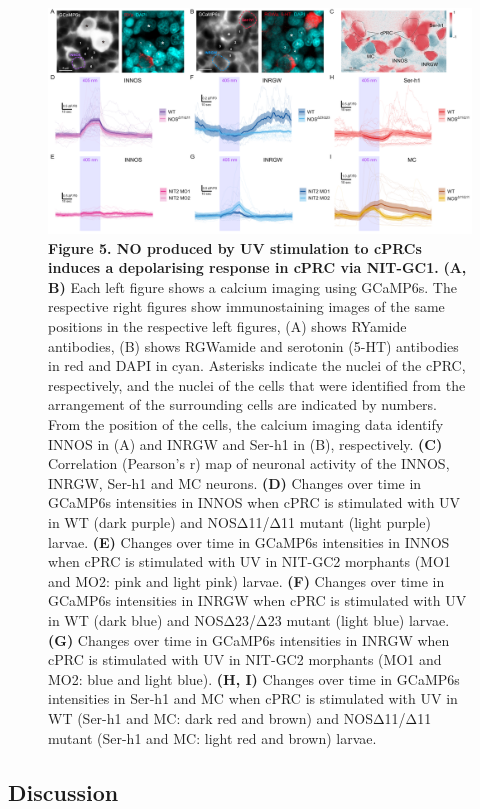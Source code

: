 \documentclass[
  10pt,
  onecolumn]{article}
\begin{document}
\begin{figure}
\centering
\includegraphics[width=1\textwidth,height=\textheight]{../figures/Fig5.png}
\caption{\textbf{Figure 5. NO produced by UV stimulation to cPRCs
induces a depolarising response in cPRC via NIT-GC1.} \textbf{(A, B)}
Each left figure shows a calcium imaging using GCaMP6s. The respective
right figures show immunostaining images of the same positions in the
respective left figures, (A) shows RYamide antibodies, (B) shows
RGWamide and serotonin (5-HT) antibodies in red and DAPI in cyan.
Asterisks indicate the nuclei of the cPRC, respectively, and the nuclei
of the cells that were identified from the arrangement of the
surrounding cells are indicated by numbers. From the position of the
cells, the calcium imaging data identify INNOS in (A) and INRGW and
Ser-h1 in (B), respectively. \textbf{(C)} Correlation (Pearson's r) map
of neuronal activity of the INNOS, INRGW, Ser-h1 and MC neurons.
\textbf{(D)} Changes over time in GCaMP6s intensities in INNOS when cPRC
is stimulated with UV in WT (dark purple) and NOSΔ11/Δ11 mutant (light
purple) larvae. \textbf{(E)} Changes over time in GCaMP6s intensities in
INNOS when cPRC is stimulated with UV in NIT-GC2 morphants (MO1 and MO2:
pink and light pink) larvae. \textbf{(F)} Changes over time in GCaMP6s
intensities in INRGW when cPRC is stimulated with UV in WT (dark blue)
and NOSΔ23/Δ23 mutant (light blue) larvae. \textbf{(G)} Changes over
time in GCaMP6s intensities in INRGW when cPRC is stimulated with UV in
NIT-GC2 morphants (MO1 and MO2: blue and light blue). \textbf{(H, I)}
Changes over time in GCaMP6s intensities in Ser-h1 and MC when cPRC is
stimulated with UV in WT (Ser-h1 and MC: dark red and brown) and
NOSΔ11/Δ11 mutant (Ser-h1 and MC: light red and brown) larvae.}
\end{figure}

\hypertarget{discussion}{%
\subsection{Discussion}\label{discussion}}
\end{document}
